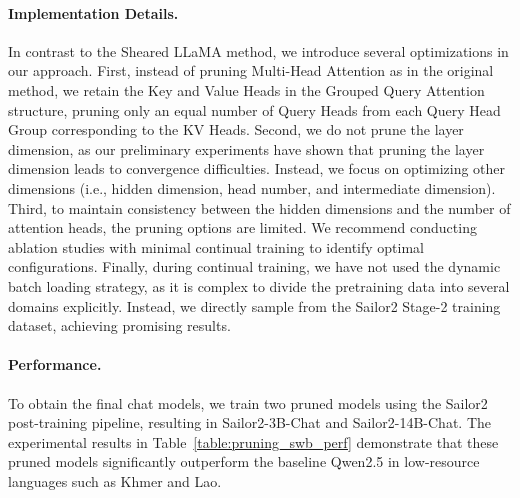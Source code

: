 \paragraph{Implementation Details.} In contrast to the Sheared LLaMA method, we introduce several optimizations in our approach. First, instead of pruning Multi-Head Attention as in the original method, we retain the Key and Value Heads in the Grouped Query Attention~\citep{ainslie2023gqa} structure, pruning only an equal number of Query Heads from each Query Head Group corresponding to the KV Heads. Second, we do not prune the layer dimension, as our preliminary experiments have shown that pruning the layer dimension leads to convergence difficulties. Instead, we focus on optimizing other dimensions (i.e., hidden dimension, head number, and intermediate dimension). Third, to maintain consistency between the hidden dimensions and the number of attention heads, the pruning options are limited. We recommend conducting ablation studies with minimal continual training to identify optimal configurations. Finally, during continual training,  we have not used the dynamic batch loading strategy, as it is complex to divide the pretraining data into several domains explicitly.
Instead, we directly sample from the Sailor2 Stage-2 training dataset, achieving promising results.
 
\paragraph{Performance.} To obtain the final chat models, we train two pruned models using the Sailor2 post-training pipeline, resulting in Sailor2-3B-Chat and Sailor2-14B-Chat. 
The experimental results in Table~\ref{table:pruning_swb_perf} demonstrate that these pruned models significantly outperform the baseline Qwen2.5 in low-resource languages such as Khmer and Lao.




